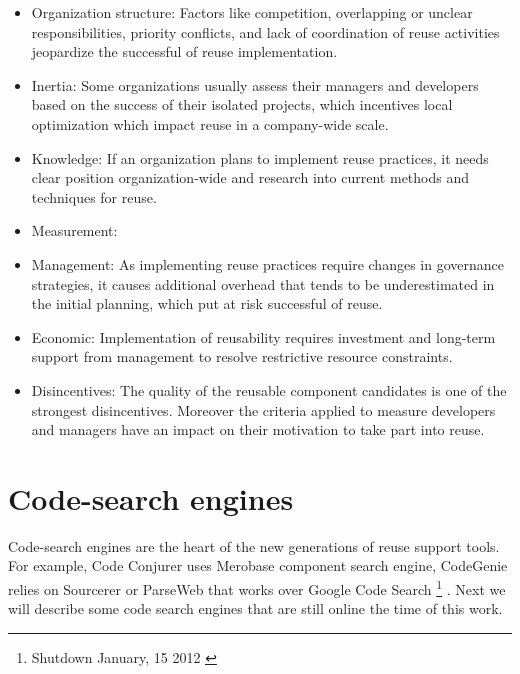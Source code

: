 \begin{itemize}
\item Organization structure: Factors like competition, overlapping or unclear responsibilities, priority conflicts, and lack of coordination of reuse activities jeopardize the successful of reuse implementation. 
\item Inertia: Some organizations usually assess their managers and developers based on the success of their isolated projects, which incentives local optimization which impact reuse in a company-wide scale. 
\item Knowledge: If an organization plans to implement reuse practices, it needs clear position organization-wide and research into current methods and techniques for reuse.
\item Measurement: 
\item Management: As implementing reuse practices require changes in governance strategies, it causes additional overhead that tends to be underestimated in the initial planning, which put at risk successful of reuse.
\item Economic: Implementation of reusability requires investment and long-term support from management to resolve restrictive resource constraints.
\item Disincentives: The quality of the reusable component candidates is one of the strongest disincentives. Moreover the criteria applied to measure developers and managers have an impact on their motivation to take part into reuse.
\end{itemize}

\section{Code-search engines}
Code-search engines are the heart of the new generations of reuse support tools. For example, Code Conjurer \citep{Hummel2008} uses Merobase component search engine, CodeGenie relies on Sourcerer \citep{Lemos2007} or ParseWeb that works over Google Code Search \footnote{Shutdown January, 15 2012 \citep{Horowitz2011}} \citep{Thummalapenta2007}. Next we will describe some code search engines that are still online the time of this work.

